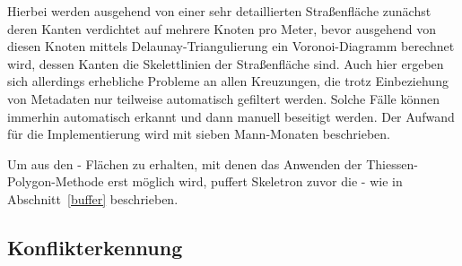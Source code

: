 \documentclass[../main/thesis.tex]{subfiles}
\begin{document}

Hierbei werden ausgehend von einer sehr detaillierten Straßenfläche zunächst deren Kanten verdichtet auf mehrere Knoten pro Meter, bevor ausgehend von diesen Knoten mittels Delaunay-Triangulierung ein Voronoi-Diagramm berechnet wird, dessen Kanten die Skelettlinien der Straßenfläche sind. Auch hier ergeben sich allerdings erhebliche Probleme an allen Kreuzungen, die trotz Einbeziehung von Metadaten nur teilweise automatisch gefiltert werden. Solche Fälle können immerhin automatisch erkannt und dann manuell beseitigt werden. Der Aufwand für die Implementierung wird mit sieben Mann-Monaten beschrieben. 

Um aus den \osm- Flächen zu erhalten, mit denen das Anwenden der Thiessen-Polygon-Methode erst möglich wird, puffert Skeletron zuvor die \osm- wie in Abschnitt~\ref{buffer} beschrieben. 



\subsection{Konflikterkennung}

\end{document}
